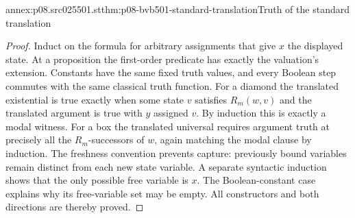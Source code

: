 \begin{annexitem}{annex:p08.src025501.st}{thm:p08-bvb501-standard-translation}{Truth of the standard translation}
\begin{proof}
Induct on the formula for arbitrary assignments that give \(x\) the
displayed state. At a proposition the first-order predicate has exactly
the valuation's extension. Constants have the same fixed truth values,
and every Boolean step commutes with the same classical truth function.
For a diamond the translated existential is true exactly when some state
\(v\) satisfies \(R_m(w,v)\) and the translated argument is true with
\(y\) assigned \(v\). By induction this is exactly a modal witness.
For a box the translated universal requires argument truth at precisely
all the \(R_m\)-successors of \(w\), again matching the modal clause
by induction. The freshness convention prevents capture: previously
bound variables remain distinct from each new state variable. A separate
syntactic induction shows that the only possible free variable is \(x\).
The Boolean-constant case explains why its free-variable set may be empty.
All constructors and both directions are thereby proved.
\end{proof}
\end{annexitem}

